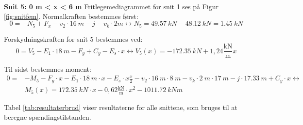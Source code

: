 \textbf{Snit 5: 0 m < x < 6 m}
\newline
Fritlegemediagrammet for snit 1 ses på Figur \ref{fig:snitfem}.
\newline
\newline
Normalkraften bestemmes først:
\begin{equation}
	0 = - N_5 + F_x - v_2 \cdot \SI{16}{m} - j - v_k \cdot 2m \leftrightarrow N_5 = \SI{49,57}{kN} - \SI{48,12}{kN} = \SI{1,45}{kN}
\end{equation}

Forskydningskraften for snit 5 bestemmes ved:
\begin{equation}
	0 = V_5 - E_1 \cdot \SI{18}{m} - F_y + C_y - E_s \cdot x \leftrightarrow V_5(x) = \SI{-172,35}{kN} + 1,\!24 \frac{\text{kN}}{\text{m}}x
\end{equation}

Til sidst bestemmes moment:
\begin{equation}
\begin{split}
	0 = & - M_5 - F_y \cdot x - E_1 \cdot \SI{18}{m} \cdot x - E_s \cdot x \frac{x}{2} - v_2 \cdot \SI{16}{m} \cdot \SI{8}{m} - v_k \cdot \SI{2}{m} \cdot \SI{17}{m} - j \cdot \SI{17,33}{m} + C_y \cdot x \leftrightarrow \\ & M_5(x) =  \SI{172,35}{kN} \cdot x - 0,\!62 \frac{\text{kN}}{\text{m}} \cdot x^2 - \SI{1011,72}{kNm}
\end{split}
\end{equation}

Tabel \ref{tab:resultaterbrud} viser resultaterne for alle snittene, som bruges til at beregne spændingstilstanden. 

